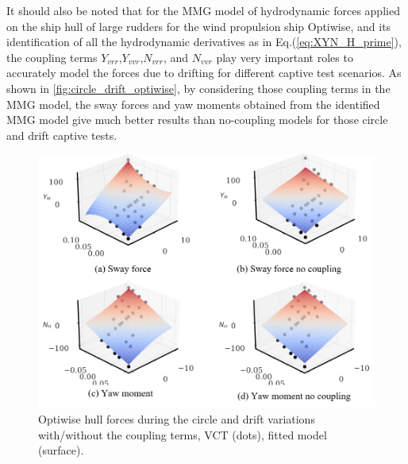 It should also be noted that for the MMG model of hydrodynamic forces applied on the ship hull of large rudders for the wind propulsion ship Optiwise, and its identification of all the hydrodynamic derivatives as in Eq.(\ref{eq:XYN_H_prime}), the coupling terms $Y_{vrr}$,$Y_{vvr}$,$N_{vrr}$, and $N_{vvr}$ play very important roles to accurately model the forces due to drifting for different captive test scenarios. As shown in \autoref{fig:circle_drift_optiwise}, by considering those coupling terms in the MMG model, the sway forces and yaw moments obtained from the identified MMG model give much better results than no-coupling models for those circle and drift captive tests.


\begin{figure}[ht]
    \centering
    \includegraphics[width=0.8\linewidth]{figures/results_optiwise_vct.YNH.png}
    \caption{Optiwise hull forces during the circle and drift variations with/without the coupling terms, VCT (dots), fitted model (surface).}
    \label{fig:circle_drift_optiwise}
\end{figure}


%          
     
